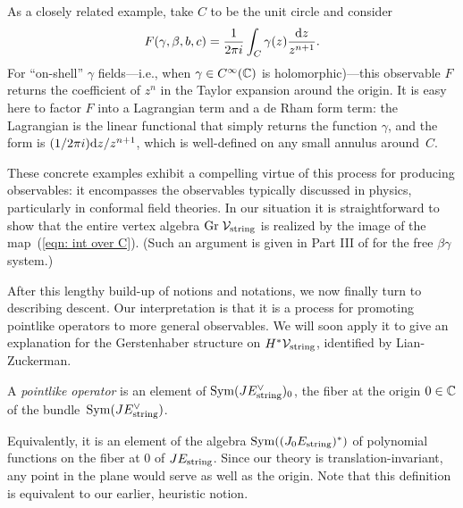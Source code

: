 As a closely related example, take $C$ to be the unit circle and consider
\[
F(\gamma,\beta,b,c) = \frac{1}{2\pi i}\int_C \gamma(z) \frac{{\rm d} z}{z^{n+1}}.
\]
For ``on-shell'' $\gamma$ fields---i.e., when $\gamma \in C^\infty(\mathbb C)$ is holomorphic)---this observable $F$ returns the coefficient of $z^n$ in the Taylor expansion around the origin.
It is easy here to factor $F$ into a Lagrangian term and a de Rham form term: 
the Lagrangian is the linear functional that simply returns the function $\gamma$, 
and the form is $(1/2\pi i){\rm d} z/z^{n+1}$, which is well-defined on any small annulus around~$C$.

These concrete examples exhibit a compelling virtue of this process for producing observables: 
it encompasses the observables typically discussed in physics, 
particularly in conformal field theories.
In our situation it is straightforward to show that the entire vertex algebra ${\rm Gr}\; \mathcal{V}_{\rm string}$ is realized by the image of the map~(\ref{eqn: int over C}).
(Such an argument is given in Part III of \cite{GGW} for the free $\beta\gamma$ system.)

After this lengthy build-up of notions and notations, 
we now finally turn to describing descent.
Our interpretation is that it is a process for promoting pointlike operators to more general observables.
We will soon apply it to give an explanation for the Gerstenhaber structure on $H^* \mathcal{V}_{\rm string}$,
identified by Lian-Zuckerman.

\begin{dfn}
A {\em pointlike operator} is an element of ${\rm Sym}(J E_{\rm string}^\vee)_0$, 
the fiber at the origin $0 \in \mathbb C$ of the bundle~${\rm Sym}(J E_{\rm string}^\vee)$.
\end{dfn}

Equivalently, it is an element of the algebra ${\rm Sym}((J_0E_{\rm string})^*)$ of polynomial functions on the fiber at $0$ of $J E_{\rm string}$.
Since our theory is translation-invariant, 
any point in the plane would serve as well as the origin.
Note that this definition is equivalent to our earlier, heuristic notion.

